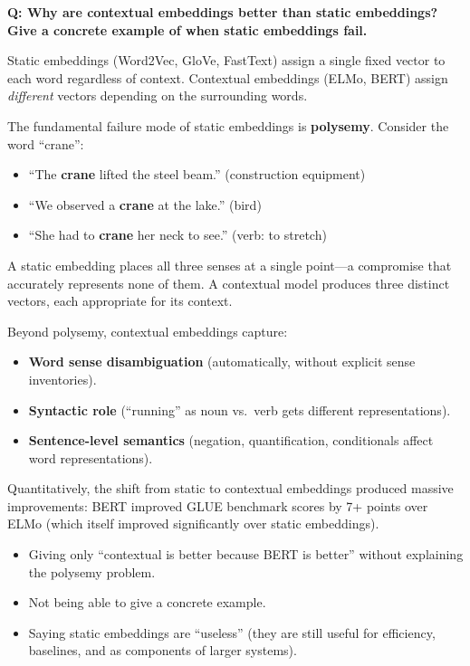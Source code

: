 \begin{interviewq}
\textbf{Q: Why are contextual embeddings better than static embeddings?
Give a concrete example of when static embeddings fail.}

 \quad {} \quad \badgefreq{\freqhigh}

\stronganswer
Static embeddings (Word2Vec, GloVe, FastText) assign a single fixed vector to
each word regardless of context.  Contextual embeddings (ELMo, BERT) assign
\emph{different} vectors depending on the surrounding words.

The fundamental failure mode of static embeddings is \textbf{polysemy}.
Consider the word ``crane'':
\begin{itemize}
    \item ``The \textbf{crane} lifted the steel beam.'' (construction
    equipment)
    \item ``We observed a \textbf{crane} at the lake.'' (bird)
    \item ``She had to \textbf{crane} her neck to see.'' (verb: to stretch)
\end{itemize}
A static embedding places all three senses at a single point---a compromise
that accurately represents none of them.  A contextual model produces three
distinct vectors, each appropriate for its context.

Beyond polysemy, contextual embeddings capture:
\begin{itemize}
    \item \textbf{Word sense disambiguation} (automatically, without explicit
    sense inventories).
    \item \textbf{Syntactic role} (``running'' as noun vs.\ verb gets
    different representations).
    \item \textbf{Sentence-level semantics} (negation, quantification,
    conditionals affect word representations).
\end{itemize}

Quantitatively, the shift from static to contextual embeddings produced
massive improvements: BERT improved GLUE benchmark scores by 7+ points over
ELMo (which itself improved significantly over static embeddings).

\redflags
\begin{itemize}
    \item Giving only ``contextual is better because BERT is better'' without
    explaining the polysemy problem.
    \item Not being able to give a concrete example.
    \item Saying static embeddings are ``useless'' (they are still useful
    for efficiency, baselines, and as components of larger systems).
\end{itemize}


\end{interviewq}
